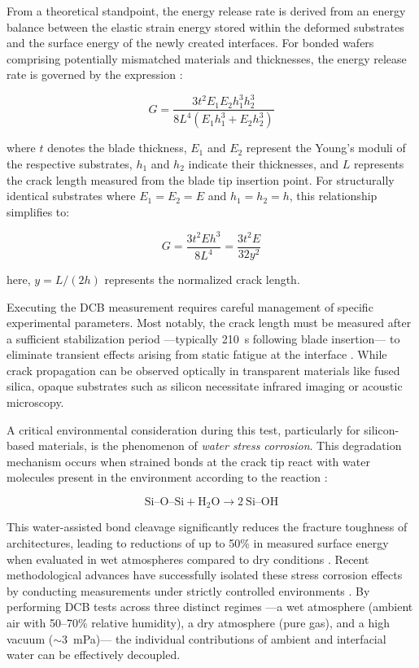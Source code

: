From a theoretical standpoint, the energy release rate is derived from an energy balance 
between the elastic strain energy stored within the deformed substrates and the surface 
energy of the newly created interfaces. For bonded wafers comprising potentially mismatched 
materials and thicknesses, the energy release rate is governed by the expression \cite{takeuchi2022}:

\begin{equation}
G = \frac{3t^2 E_1 E_2 h_1^3 h_2^3}{8L^4(E_1 h_1^3 + E_2 h_2^3)}
\label{eq:dcb_energy}
\end{equation}

\noindent where $t$ denotes the blade thickness, $E_1$ and $E_2$ represent the Young's 
moduli of the respective substrates, $h_1$ and $h_2$ indicate their thicknesses, and $L$ 
represents the crack length measured from the blade tip insertion point. For structurally 
identical substrates where $E_1 = E_2 = E$ and $h_1 = h_2 = h$, this relationship simplifies to:

\begin{equation}
G = \frac{3t^2 Eh^3}{8L^4} = \frac{3t^2 E}{32y^2}
\label{eq:dcb_simplified}
\end{equation}

\noindent here, $y = L/(2h)$ represents the normalized crack length.

Executing the DCB measurement requires careful management of specific experimental parameters. 
Most notably, the crack length must be measured after a sufficient stabilization period ---typically 
\SI{210}{\second} following blade insertion--- to eliminate transient effects arising from static fatigue 
at the interface \cite{takeuchi2022}. While crack propagation can be observed optically in transparent 
materials like fused silica, opaque substrates such as silicon necessitate infrared imaging or acoustic microscopy.

A critical environmental consideration during this test, particularly for silicon-based materials, is 
the phenomenon of \textit{water stress corrosion}. This degradation mechanism occurs when strained 
 bonds at the crack tip react with water molecules present in the environment according 
to the reaction \cite{fournel2015}:

\begin{equation}
\text{Si--O--Si}+ \text{H}_2\text{O} \rightarrow 2~\text{Si--OH}
\end{equation}

This water-assisted bond cleavage significantly reduces the fracture toughness of  
architectures, leading to reductions of up to 50\% in measured surface energy when evaluated 
in wet atmospheres compared to dry conditions \cite{fournel2015}. Recent methodological 
advances have successfully isolated these stress corrosion effects by conducting measurements 
under strictly controlled environments \cite{takeuchi2022}. By performing DCB tests across three 
distinct regimes ---a wet atmosphere (ambient air with 50--70\% relative humidity), a dry atmosphere 
(pure  gas), and a high vacuum ($\sim$\SI{3}{\milli\pascal})--- the individual contributions 
of ambient and interfacial water can be effectively decoupled.

